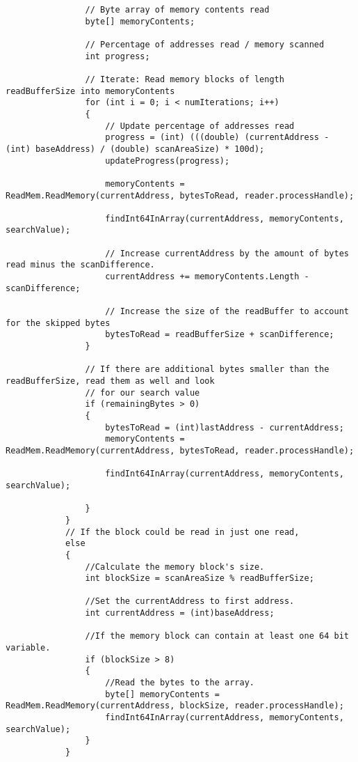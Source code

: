 \begin{lstlisting}
                // Byte array of memory contents read
                byte[] memoryContents;

                // Percentage of addresses read / memory scanned
                int progress;

                // Iterate: Read memory blocks of length readBufferSize into memoryContents
                for (int i = 0; i < numIterations; i++)
                {
                    // Update percentage of addresses read
                    progress = (int) (((double) (currentAddress - (int) baseAddress) / (double) scanAreaSize) * 100d);
                    updateProgress(progress);

                    memoryContents = ReadMem.ReadMemory(currentAddress, bytesToRead, reader.processHandle);

                    findInt64InArray(currentAddress, memoryContents, searchValue);

                    // Increase currentAddress by the amount of bytes read minus the scanDifference.
                    currentAddress += memoryContents.Length - scanDifference;

                    // Increase the size of the readBuffer to account for the skipped bytes
                    bytesToRead = readBufferSize + scanDifference;
                }

                // If there are additional bytes smaller than the readBufferSize, read them as well and look
                // for our search value
                if (remainingBytes > 0)
                {
                    bytesToRead = (int)lastAddress - currentAddress;
                    memoryContents = ReadMem.ReadMemory(currentAddress, bytesToRead, reader.processHandle);
                    
                    findInt64InArray(currentAddress, memoryContents, searchValue);

                }
            }
            // If the block could be read in just one read,
            else
            {
                //Calculate the memory block's size.
                int blockSize = scanAreaSize % readBufferSize;

                //Set the currentAddress to first address.
                int currentAddress = (int)baseAddress;

                //If the memory block can contain at least one 64 bit variable.
                if (blockSize > 8)
                {
                    //Read the bytes to the array.
                    byte[] memoryContents = ReadMem.ReadMemory(currentAddress, blockSize, reader.processHandle);
                    findInt64InArray(currentAddress, memoryContents, searchValue);
                }
            }


\end{lstlisting}
